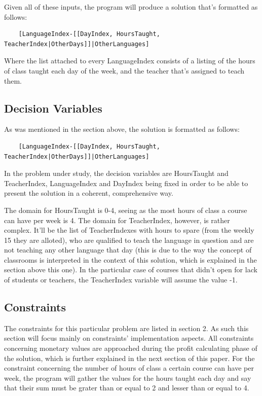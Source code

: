 \documentclass{llncs}
\begin{document}
Given all of these inputs, the program will produce a solution that's formatted as follows:
\begin{verbatim}
	[LanguageIndex-[[DayIndex, HoursTaught, TeacherIndex|OtherDays]]|OtherLanguages]
\end{verbatim}

Where the list attached to every LanguageIndex consists of a listing of the hours of class taught each day of the week, and the teacher that's assigned to teach them.

\subsection{Decision Variables}
As was mentioned in the section above, the solution is formatted as follows:
\begin{verbatim}
	[LanguageIndex-[[DayIndex, HoursTaught, TeacherIndex|OtherDays]]|OtherLanguages]
\end{verbatim}

In the problem under study, the decision variables are HoursTaught and TeacherIndex, LanguageIndex and DayIndex being fixed in order to be able to present the solution in a coherent, comprehensive way.

The domain for HoursTaught is 0-4, seeing as the most hours of class a course can have per week is 4. The domain for TeacherIndex, however, is rather complex. It'll be the list of  TeacherIndexes with hours to spare (from the weekly 15 they are alloted), who are qualified to teach the language in question and are not teaching any other language that day (this is due to the way the concept of classrooms is interpreted in the context of this solution, which is explained in the section above this one). In the particular case of courses that didn't open for lack of students or teachers, the TeacherIndex variable will assume the value -1.

\subsection{Constraints}
The constraints for this particular problem are listed in section 2. As such this section will focus mainly on constraints' implementation aspects. All constraints concerning monetary values are approached during the profit calculating phase of the solution, which is further explained in the next section of this paper. For the constraint concerning the number of hours of class a certain course can have per week, the program will gather the values for the hours taught each day and say that their sum must be grater than or equal to 2 and lesser than or equal to 4. 
\end{document}
